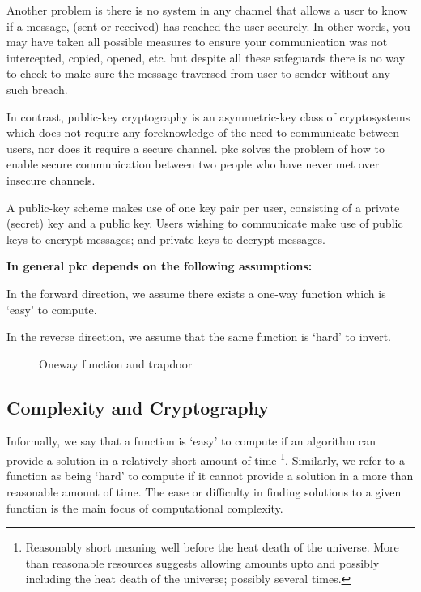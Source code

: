 \smallskip

\begin{rem}
	Another problem is there is no system in any channel that allows a user to know if a message, (sent or received) has reached the user securely. In other words, you may have taken all possible measures to ensure your communication was not intercepted, copied, opened, etc. but despite all these safeguards there is no way to check to make sure the message traversed from user to sender without any such breach.
\end{rem}

\bigskip

In contrast, public-key cryptography is an asymmetric-key class of cryptosystems which does not require any foreknowledge of the need to communicate between users, nor does it require a secure channel. \acrfull{pkc} solves the problem of how to enable secure communication between two people who have never met over insecure channels. 

A public-key scheme makes use of one key pair per user, consisting of a private (secret) key and a public key. Users wishing to communicate make use of public keys to encrypt messages; and private keys to decrypt messages. 


\textbf{In general \acrshort{pkc} depends on the following assumptions:}
\smallskip

\begin{asu}
	In the forward direction, we assume there exists a one-way function which is `easy' to compute.
\end{asu}
\medskip

\begin{asu}
	In the reverse direction, we assume that the same function is `hard' to invert. 
\end{asu}
\vspace{.25in}
\begin{figure}[H]
    \begin{center}
        
        \caption{Oneway function and trapdoor}
        \label{dia:pkc}
    \end{center}
\end{figure}


\subsection{Complexity and Cryptography}

Informally, we say that a function is `easy' to compute if an algorithm can provide a solution in a relatively short amount of time \footnote{Reasonably short meaning well before the heat death of the universe. More than reasonable resources suggests allowing amounts upto and possibly including the heat death of the universe; possibly several times.}. Similarly, we refer to a function as being `hard' to compute if it cannot provide a solution in a more than reasonable amount of time. The ease or difficulty in finding solutions to a given function is the main focus of computational complexity. 


